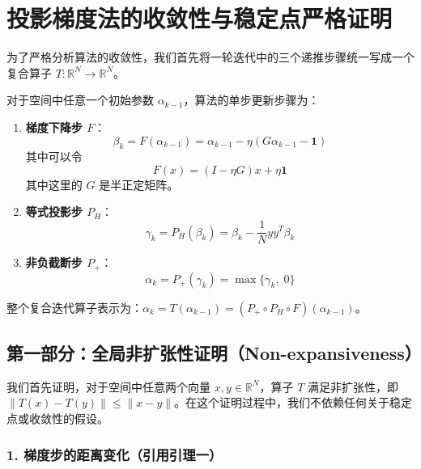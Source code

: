\section{投影梯度法的收敛性与稳定点严格证明}

为了严格分析算法的收敛性，我们首先将一轮迭代中的三个递推步骤统一写成一个复合算子 $T: \mathbb{R}^N \to \mathbb{R}^N$。

对于空间中任意一个初始参数 $\alpha_{k-1}$，算法的单步更新步骤为：

\begin{enumerate}[label=第 \arabic* 步：, leftmargin=*]
\item \textbf{梯度下降步 $F$}：
\begin{equation}
\beta_k = F(\alpha_{k-1}) = \alpha_{k-1} - \eta (G \alpha_{k-1} - \mathbf{1})
\end{equation}
其中可以令
\begin{equation}
F(x) = (I - \eta G)x + \eta \mathbf{1}
\end{equation}
其中这里的 $G$ 是半正定矩阵。

\item \textbf{等式投影步 $P_H$}：
\begin{equation}
\gamma_k = P_H(\beta_k) = \beta_k - \frac{1}{N} y y^T \beta_k
\end{equation}

\item \textbf{非负截断步 $P_+$}：
\begin{equation}
\alpha_k = P_+(\gamma_k) = \max\{\gamma_k, \; 0\}
\end{equation}
\end{enumerate}

整个复合迭代算子表示为：$\alpha_k = T(\alpha_{k-1}) = (P_+ \circ P_H \circ F)(\alpha_{k-1})$。

\subsection{第一部分：全局非扩张性证明（Non-expansiveness）}

我们首先证明，对于空间中任意两个向量 $x, y \in \mathbb{R}^N$，算子 $T$ 满足非扩张性，即
$\|T(x) - T(y)\| \leqslant \|x - y\|$。在这个证明过程中，我们不依赖任何关于稳定点或收敛性的假设。

\subsubsection{1. 梯度步的距离变化（引用引理一）}

